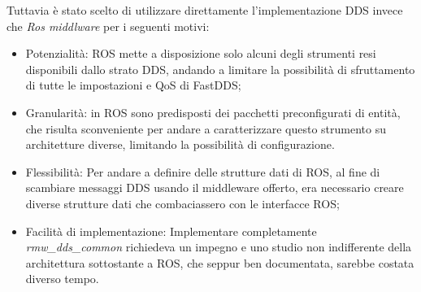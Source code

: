 Tuttavia è stato scelto di utilizzare direttamente l'implementazione DDS invece che \emph{Ros middlware} per i seguenti motivi:
\begin{itemize}
    \item Potenzialità: ROS mette a disposizione solo alcuni degli strumenti resi disponibili dallo strato DDS, andando a limitare la possibilità di sfruttamento di tutte le impostazioni e QoS di FastDDS;
    \item Granularità: in ROS sono predisposti dei pacchetti preconfigurati di entità, che risulta sconveniente per andare a caratterizzare questo strumento su architetture diverse, limitando la possibilità di configurazione.
    \item Flessibilità: Per andare a definire delle strutture dati di ROS, al fine di scambiare messaggi DDS usando il middleware offerto, era necessario creare diverse strutture dati che combaciassero con le interfacce ROS;
    \item Facilità di implementazione: Implementare completamente \emph{rmw\_dds\_common} richiedeva un impegno e uno studio non indifferente della architettura sottostante a ROS, che seppur ben documentata, sarebbe costata diverso tempo. 
\end{itemize}





